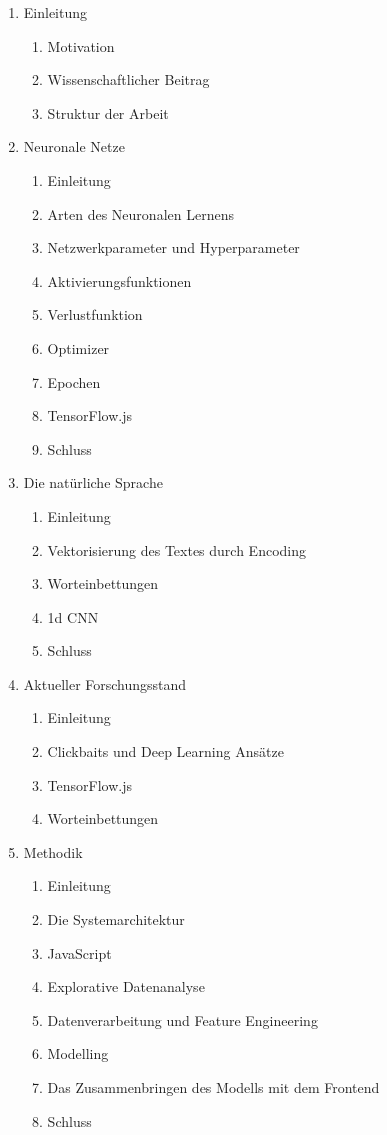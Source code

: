 \begin{enumerate}

  \item Einleitung
  \begin{enumerate}
    \item Motivation
    \item Wissenschaftlicher Beitrag
    \item Struktur der Arbeit
  \end{enumerate}

  \item Neuronale Netze
  \begin{enumerate}
    \item Einleitung
    \item Arten des Neuronalen Lernens
    \item Netzwerkparameter und Hyperparameter
    \item Aktivierungsfunktionen
    \item Verlustfunktion
    \item Optimizer
    \item Epochen
    \item TensorFlow.js
    \item Schluss
  \end{enumerate}

  \item Die natürliche Sprache
  \begin{enumerate}
    \item Einleitung
    \item Vektorisierung des Textes durch Encoding
    \item Worteinbettungen
    \item 1d CNN
    \item Schluss
  \end{enumerate}

  \item Aktueller Forschungsstand
  \begin{enumerate}
  \item Einleitung
  \item Clickbaits und Deep Learning Ansätze
  \item TensorFlow.js 
  \item Worteinbettungen
  \end{enumerate}

  \item Methodik
  \begin{enumerate}
    \item Einleitung
    \item Die Systemarchitektur
    \item JavaScript
    \item Explorative Datenanalyse
    \item Datenverarbeitung und Feature Engineering
    \item Modelling
    \item Das Zusammenbringen des Modells mit dem Frontend
    \item Schluss
  \end{enumerate}


\end{enumerate}
